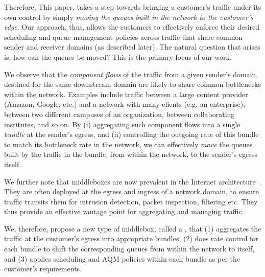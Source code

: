 Therefore, This paper,  takes a step towards bringing a customer's traffic under its own control by simply \emph{moving the queues built in the network to the customer's edge}. Our approach, thus, allows the customers to effectively enforce their desired scheduling and queue management policies across traffic that share common sender and receiver domains (as described later). The natural question that arises is, how can the queues be moved? This is the primary focus of our work. 

We observe that the \emph{component flows} of the traffic from a given sender's domain, destined for the same downstream domain are likely to share common bottlenecks within the network. Examples include traffic between a large content provider (\eg Amazon, Google, etc.) and a network with many clients (e.g. an enterprise), between two different campuses of an organization, between collaborating institutes, and so on. By (i) aggregating such component flows into a single \emph{bundle} at the sender's egress, and (ii) controlling the outgoing rate of this bundle to match its bottleneck rate in the network, we can effectively \emph{move} the queues built by the traffic in the bundle, from within the network, to the sender's egress itself. 

We further note that middleboxes are now prevalent in the Internet architecture~\cite{aplomb}. They are often deployed at the egress and ingress of a network domain, to ensure traffic transits them for intrusion detection, packet inspection, filtering etc. They thus provide an effective vantage point for aggregating and managing traffic. 

We, therefore, propose a new type of middlebox, called a \name, that (1) aggregates the traffic at the customer's egress into appropriate bundles, (2) does rate control for each bundle to shift the corresponding queues from within the network to itself, and (3) applies scheduling and AQM policies within each bundle as per the customer's requirements. 

